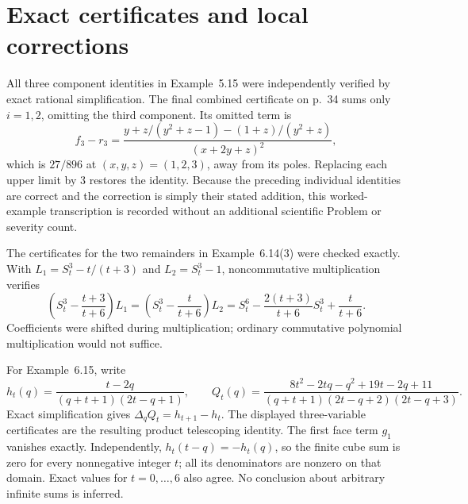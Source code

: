 \documentclass[10pt]{article}
\begin{document}
\section*{Exact certificates and local corrections}
All three component identities in Example 5.15 were independently verified by exact rational simplification. The final combined certificate on p. 34 sums only \(i=1,2\), omitting the third component. Its omitted term is \[f_3-r_3=
 \frac{y+z/(y^2+z-1)-(1+z)/(y^2+z)}
      {(x+2y+z)^2},\] which is \(27/896\) at \((x,y,z)=(1,2,3)\), away from its poles. Replacing each upper limit by 3 restores the identity. Because the preceding individual identities are correct and the correction is simply their stated addition, this worked-example transcription is recorded without an additional scientific Problem or severity count.\par
The certificates for the two remainders in Example 6.14(3) were checked exactly. With \(L_1=S_t^3-t/(t+3)\) and \(L_2=S_t^3-1\), noncommutative multiplication verifies \[\left(S_t^3-\frac{t+3}{t+6}\right)L_1
 =\left(S_t^3-\frac{t}{t+6}\right)L_2
 =S_t^6-\frac{2(t+3)}{t+6}S_t^3+\frac{t}{t+6}.\] Coefficients were shifted during multiplication; ordinary commutative polynomial multiplication would not suffice.\par
For Example 6.15, write \[h_t(q)=\frac{t-2q}{(q+t+1)(2t-q+1)},\qquad
 Q_t(q)=\frac{8t^2-2tq-q^2+19t-2q+11}
 {(q+t+1)(2t-q+2)(2t-q+3)}.\] Exact simplification gives \(\Delta_q Q_t=h_{t+1}-h_t\). The displayed three-variable certificates are the resulting product telescoping identity. The first face term \(g_1\) vanishes exactly. Independently, \(h_t(t-q)=-h_t(q)\), so the finite cube sum is zero for every nonnegative integer \(t\); all its denominators are nonzero on that domain. Exact values for \(t=0,\ldots,6\) also agree. No conclusion about arbitrary infinite sums is inferred.\par
\end{document}
